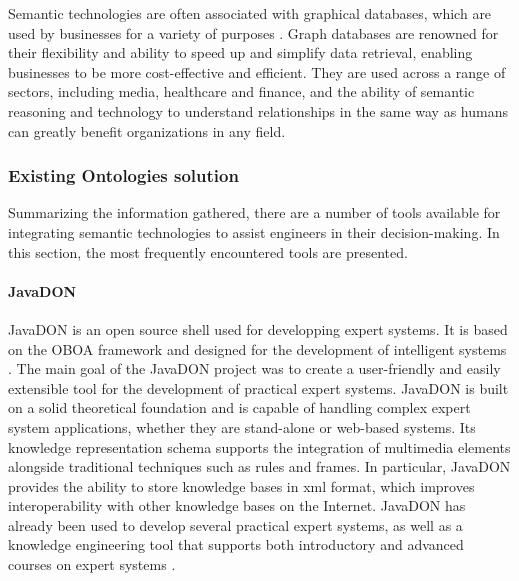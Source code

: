             Semantic technologies are often associated with graphical databases, which are used by businesses for a variety of purposes \cite{eshach2003case}. Graph databases are renowned for their flexibility and ability to speed up and simplify data retrieval, enabling businesses to be more cost-effective and efficient. They are used across a range of sectors, including media, healthcare and finance, and the ability of semantic reasoning and technology to understand relationships in the same way as humans can greatly benefit organizations in any field.\\
        
        \subsubsection{Existing Ontologies solution\label{sec:exonto}}
        Summarizing the information gathered, there are a number of tools available for integrating semantic technologies to assist engineers in their decision-making. In this section, the most frequently encountered tools are presented.
        
            \paragraph{JavaDON}
            JavaDON is an open source shell used for developping expert systems. It is based on the OBOA framework and designed for the development of intelligent systems \cite{jovanovic2005achieving}. The main goal of the JavaDON project was to create a user-friendly and easily extensible tool for the development of practical expert systems. JavaDON is built on a solid theoretical foundation and is capable of handling complex expert system applications, whether they are stand-alone or web-based systems. Its knowledge representation schema supports the integration of multimedia elements alongside traditional techniques such as rules and frames. In particular, JavaDON provides the ability to store knowledge bases in \acrshort{xml} format, which improves interoperability with other knowledge bases on the Internet. JavaDON has already been used to develop several practical expert systems, as well as a knowledge engineering tool that supports both introductory and advanced courses on expert systems \cite{tomic2006javadon}.
        
